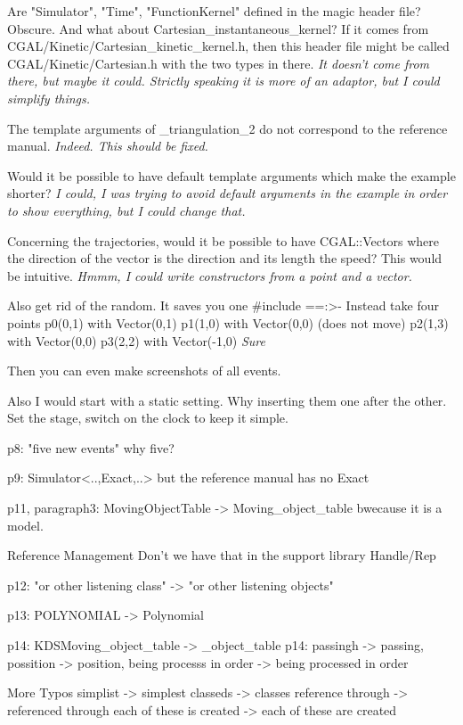 Are "Simulator", "Time", "FunctionKernel" defined in the
magic header file? Obscure.
And what about Cartesian_instantaneous_kernel? If it comes
from CGAL/Kinetic/Cartesian_kinetic_kernel.h, then this
header file might be called CGAL/Kinetic/Cartesian.h
with the two types in there.
\textit{It doesn't come from there, but maybe it could. Strictly speaking it is more of an adaptor, but I could simplify things. }


The template arguments of _triangulation_2
do not correspond to the reference manual.
\textit{Indeed. This should be fixed.}

Would it be possible to have default template arguments which
make the example shorter?
\textit{I could, I was trying to avoid default arguments in the example in order to show everything, but I could change that.}

Concerning the trajectories, would it be possible to have CGAL::Vectors
where the direction of the vector is the direction and its length
the speed? This would be intuitive.
\textit{Hmmm, I could write constructors from a point and a vector.}

Also get rid of the random. It saves you one #include ==:>-
Instead take four points
p0(0,1) with Vector(0,1)
p1(1,0) with Vector(0,0) (does not move)
p2(1,3) with Vector(0,0)
p3(2,2) with Vector(-1,0)
\textit{Sure}

Then you can even make screenshots of all events.

Also I would start with a static setting. Why inserting them
one after the other. Set the stage, switch on the clock
to keep it simple.


p8: "five new events" why five?

p9: Simulator<..,Exact,..>  but the reference manual has no Exact

p11, paragraph3: MovingObjectTable -> Moving_object_table bwecause it is a model.


Reference Management  Don't we have that in the support library Handle/Rep

p12: "or other listening class" -> "or other listening objects"


p13: POLYNOMIAL -> Polynomial

p14: KDSMoving_object_table -> _object_table
p14: passingh -> passing, possition -> position, being processs in order -> being processed in order

More Typos
simplist -> simplest
classeds -> classes
reference through -> referenced through
each of these is created -> each of these are created


